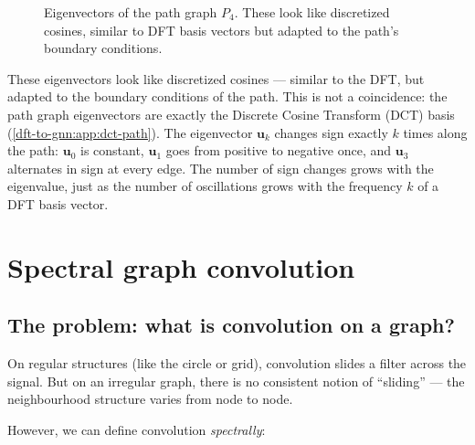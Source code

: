 \begin{notechapter}
\begin{figure}[H]
\caption{Eigenvectors of the path graph $P_4$. These look like discretized
         cosines, similar to DFT basis vectors but adapted to the path's
         boundary conditions.}
\end{figure}

These eigenvectors look like discretized cosines --- similar to the DFT,
but adapted to the boundary conditions of the path. This is not a
coincidence: the path graph eigenvectors are exactly the Discrete
Cosine Transform (DCT) basis (\cref{dft-to-gnn:app:dct-path}). The eigenvector $\mathbf{u}_k$ changes sign exactly $k$ times along the path: $\mathbf{u}_0$ is constant, $\mathbf{u}_1$ goes from positive to negative once, and $\mathbf{u}_3$ alternates in sign at every edge. The number of sign changes grows with the eigenvalue, just as the number of oscillations grows with the frequency $k$ of a DFT basis vector.

\section{Spectral graph convolution}

\subsection{The problem: what is convolution on a graph?}

On regular structures (like the circle or grid), convolution slides a
filter across the signal. But on an irregular graph, there is no
consistent notion of ``sliding'' --- the neighbourhood structure varies
from node to node.

However, we can define convolution \emph{spectrally}:


\end{notechapter}
